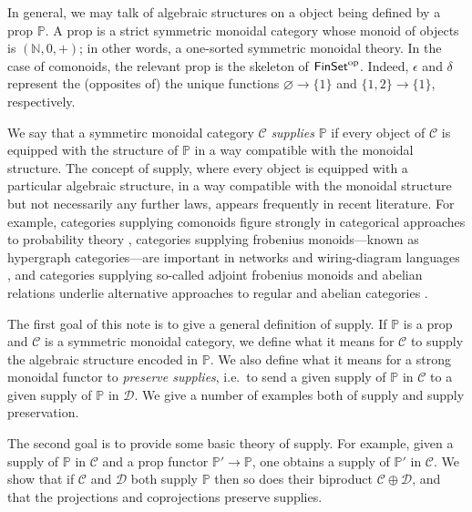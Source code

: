 \documentclass[11pt, oneside, article]{memoir}
\theoremstyle{plain}
\theoremstyle{definition}
\theoremstyle{remark}
\newcommand{\cat}[1]{\mathcal{#1}}%
\newcommand{\Cat}[1]{{\mathsf{#1}}}%
\newcommand{\tn}[1]{\textnormal{#1}}
\newcommand{\op}{^{\tn{op}}}
\newcommand{\finset}{\Cat{FinSet}}
\newcommand{\nn}{\mathbb{N}}
\newcommand{\pp}{\mathbb{P}}
\begin{document}
In general, we may talk of algebraic structures on a object being defined by a prop $\pp$. A prop is a strict symmetric monoidal category whose monoid of objects is $(\nn,0,+)$; in other words, a one-sorted symmetric monoidal theory. In the case of comonoids, the relevant prop is the skeleton of $\finset\op$. Indeed, $\epsilon$ and $\delta$ represent the (opposites of) the unique functions $\varnothing\to\{1\}$ and $\{1,2\}\to\{1\}$, respectively.

We say that a symmetirc monoidal category $\cat{C}$ \emph{supplies} $\pp$ if every object of $\cat{C}$ is equipped with the structure of $\pp$ in a way compatible with the monoidal structure. The concept of supply, where every object is equipped with a particular algebraic structure, in a way compatible with the monoidal structure but not necessarily any further laws, appears frequently in recent literature. For example, categories supplying comonoids figure strongly in categorical approaches to probability theory \cite{fong2013causal,fritz2019}, categories supplying frobenius monoids---known as hypergraph categories---are important in networks and wiring-diagram languages \cite{fong2019hypergraph}, and categories supplying so-called adjoint frobenius monoids and abelian relations underlie alternative approaches to regular and abelian categories \cite{fong2019abelian}.

The first goal of this note is to give a general definition of supply. If $\pp$ is a prop and $\cat{C}$ is a symmetric monoidal category, we define what it means for $\cat{C}$ to supply the algebraic structure encoded in $\pp$. We also define what it means for a strong monoidal functor to \emph{preserve supplies}, i.e.\ to send a given supply of $\pp$ in $\cat{C}$ to a given supply of $\pp$ in $\cat{D}$. We give a number of examples both of supply and supply preservation.

The second goal is to provide some basic theory of supply. For example, given a supply of $\pp$ in $\cat{C}$ and a prop functor $\pp'\to\pp$, one obtains a supply of $\pp'$ in $\cat{C}$. We show that if $\cat{C}$ and $\cat{D}$ both supply $\pp$ then so does their biproduct $\cat{C}\oplus\cat{D}$, and that the projections and coprojections preserve supplies.
\end{document}
